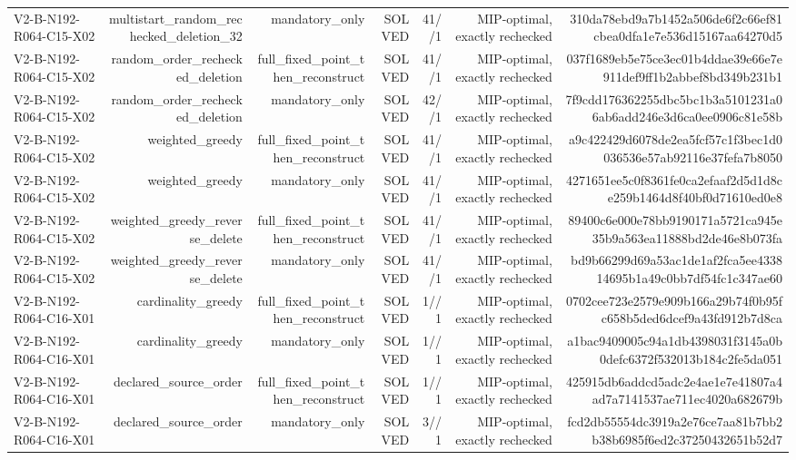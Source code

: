 {\begin{longtable}{lrrrrrr}
V2-B-N192-R064-C15-X02 & multistart\_random\_rechecked\_deletion\_32 & mandatory\_only & SOLVED & 41//1 & MIP-optimal, exactly rechecked & 310da78ebd9a7b1452a506de6f2c66ef81cbea0dfa1e7e536d15167aa64270d5 \\
V2-B-N192-R064-C15-X02 & random\_order\_rechecked\_deletion & full\_fixed\_point\_then\_reconstruct & SOLVED & 41//1 & MIP-optimal, exactly rechecked & 037f1689eb5e75ce3ec01b4ddae39e66e7e911def9ff1b2abbef8bd349b231b1 \\
V2-B-N192-R064-C15-X02 & random\_order\_rechecked\_deletion & mandatory\_only & SOLVED & 42//1 & MIP-optimal, exactly rechecked & 7f9cdd176362255dbc5bc1b3a5101231a06ab6add246e3d6ca0ee0906c81e58b \\
V2-B-N192-R064-C15-X02 & weighted\_greedy & full\_fixed\_point\_then\_reconstruct & SOLVED & 41//1 & MIP-optimal, exactly rechecked & a9c422429d6078de2ea5fcf57c1f3bec1d0036536e57ab92116e37fefa7b8050 \\
V2-B-N192-R064-C15-X02 & weighted\_greedy & mandatory\_only & SOLVED & 41//1 & MIP-optimal, exactly rechecked & 4271651ee5c0f8361fe0ca2efaaf2d5d1d8ce259b1464d8f40bf0d71610ed0e8 \\
V2-B-N192-R064-C15-X02 & weighted\_greedy\_reverse\_delete & full\_fixed\_point\_then\_reconstruct & SOLVED & 41//1 & MIP-optimal, exactly rechecked & 89400c6e000e78bb9190171a5721ca945e35b9a563ea11888bd2de46e8b073fa \\
V2-B-N192-R064-C15-X02 & weighted\_greedy\_reverse\_delete & mandatory\_only & SOLVED & 41//1 & MIP-optimal, exactly rechecked & bd9b66299d69a53ac1de1af2fca5ee433814695b1a49c0bb7df54fc1c347ae60 \\
V2-B-N192-R064-C16-X01 & cardinality\_greedy & full\_fixed\_point\_then\_reconstruct & SOLVED & 1//1 & MIP-optimal, exactly rechecked & 0702cee723e2579e909b166a29b74f0b95fc658b5ded6dcef9a43fd912b7d8ca \\
V2-B-N192-R064-C16-X01 & cardinality\_greedy & mandatory\_only & SOLVED & 1//1 & MIP-optimal, exactly rechecked & a1bac9409005c94a1db4398031f3145a0b0defc6372f532013b184c2fe5da051 \\
V2-B-N192-R064-C16-X01 & declared\_source\_order & full\_fixed\_point\_then\_reconstruct & SOLVED & 1//1 & MIP-optimal, exactly rechecked & 425915db6addcd5adc2e4ae1e7e41807a4ad7a7141537ae711ec4020a682679b \\
V2-B-N192-R064-C16-X01 & declared\_source\_order & mandatory\_only & SOLVED & 3//1 & MIP-optimal, exactly rechecked & fcd2db55554dc3919a2e76ce7aa81b7bb2b38b6985f6ed2c37250432651b52d7 \\

\end{longtable}}
